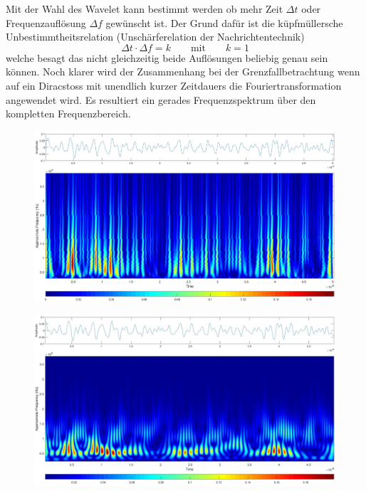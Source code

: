 \begin{refsection}
Mit der Wahl des Wavelet kann bestimmt werden ob mehr Zeit $\Delta t$ oder Frequenzauflösung $\Delta f$ gewünscht ist. 
Der Grund dafür ist die küpfmüllersche Unbestimmtheitsrelation (Unschärferelation der Nachrichtentechnik)
\begin{equation}
\Delta t \cdot \Delta f = k
\qquad\text{mit}\qquad
k = 1
\end{equation}
welche besagt das nicht gleichzeitig beide Auflösungen beliebig genau sein können.
Noch klarer wird der Zusammenhang bei der Grenzfallbetrachtung wenn auf ein Diracstoss mit unendlich kurzer Zeitdauers die Fouriertransformation angewendet wird.
Es resultiert ein gerades Frequenzspektrum über den kompletten Frequenzbereich.

\begin{figure}
	\centering
	\centering
	\includegraphics[width=1\linewidth]{papers/gis/Bilder/UnschRelHaar}
	\label{fig:UnschRelHaar}
\end{figure}
\begin{figure}
	\centering
	\includegraphics[width=1\linewidth]{papers/gis/Bilder/UnschRelMorl}

\end{figure}
\end{refsection}
